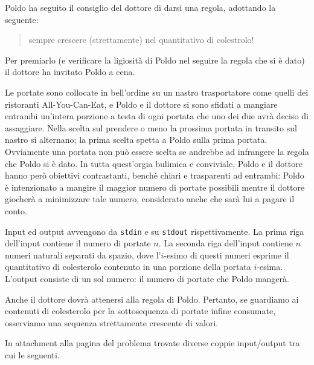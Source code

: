 \renewcommand{\nomebreve}{poldo\_game}
\renewcommand{\titolo}{Poldo vuol mangiare e il dottore rema contro}

\introduzione{}

\noindent
Poldo ha seguito il consiglio del dottore di darsi una regola, adottando la seguente:

\begin{quote}
   sempre crescere (strettamente) nel quantitativo di colestrolo!
\end{quote}

Per premiarlo (e verificare la ligiosità di Poldo nel seguire la regola che si è dato) il dottore ha invitato Poldo a cena.

Le portate sono collocate in bell'ordine su un nastro trasportatore come quelli dei ristoranti All-You-Can-Eat, e Poldo e il dottore si sono sfidati a mangiare entrambi un'intera porzione a testa di ogni portata che uno dei due avrà deciso di assaggiare. Nella scelta sul prendere o meno la prossima portata in transito sul nastro si alternano; la prima scelta spetta a Poldo sulla prima portata.
Ovviamente una portata non può essere scelta se andrebbe ad infrangere la regola che Poldo si è dato.
In tutta quest'orgia bulimica e conviviale, Poldo e il dottore hanno però obiettivi contrastanti, benchè chiari e trasparenti ad entrambi:
Poldo è intenzionato a mangire il maggior numero di portate possibili mentre il dottore giocherà a minimizzare tale numero, considerato anche che sarà lui a pagare il conto.



Input ed output avvengono da \verb'stdin' e su \verb'stdout' rispettivamente.
La prima riga dell'input contiene il numero di portate $n$.
La seconda riga dell'input contiene $n$ numeri naturali separati da spazio, dove l'$i$-esimo di questi numeri esprime il quantitativo di colesterolo contenuto in una porzione della portata $i$-esima.\\

L'output consiste di un sol numero: il numero di portate che Poldo mangerà.


Anche il dottore dovrà attenersi alla regola di Poldo. Pertanto, se guardiamo ai contenuti di colesterolo per la sottosequenza di portate infine consumate, osserviamo una sequenza strettamente crescente di valori. 



In attachment alla pagina del problema trovate diverse coppie input/output tra cui le seguenti.

